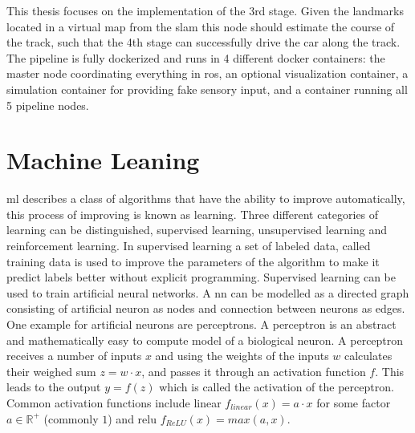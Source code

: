 This thesis focuses on the implementation of the 3rd stage. Given the landmarks located in a virtual map from the \ac{slam} this node should estimate the course of the track, such that the 4th stage can successfully drive the car along the track.
The pipeline is fully dockerized and runs in 4 different docker containers: the master node coordinating everything in \ac{ros}, an optional visualization container, a simulation container for providing fake sensory input, and a container running all 5 pipeline nodes.

\section{Machine Leaning}
\ac{ml} describes a class of algorithms that have the ability to improve automatically, this process of improving is known as learning. Three different categories of learning can be distinguished, supervised learning, unsupervised learning and reinforcement learning. In supervised learning a set of labeled data, called training data is used to improve the parameters of the algorithm to make it predict labels better without explicit programming. Supervised learning can be used to train artificial neural networks. A \ac{nn} can be modelled as a directed graph consisting of artificial neuron as nodes and connection between neurons as edges. One example for artificial neurons are perceptrons. A perceptron is an abstract and mathematically easy to compute model of a biological neuron. A perceptron receives a number of inputs $x$ and using the weights of the inputs $w$ calculates their weighed sum $z=w \cdot x$, and passes it through an activation function $f$. This leads to the output
$y=f(z)$ which is called the activation of the perceptron. Common activation functions include linear $f_{linear}(x)=a \cdot x$ for some factor $a \in \mathbb{R^+}$ (commonly $1$) and \ac{relu} $f_{ReLU}(x)=max(a,x)$.

